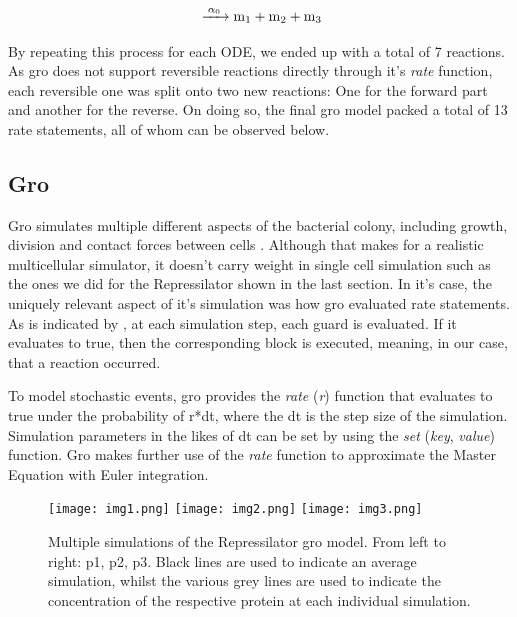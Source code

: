 \documentclass[12pt]{article}
\begin{document}
    \begin{equation}
    \ce{ ->[\alpha_{0}] m_{1} + m_{2} + m_{3}}
    \end{equation}
    
    By repeating this process for each ODE, we ended up with a total of 7 reactions. As gro does not support reversible reactions directly through it's \textit{rate} function, each reversible one was split onto two new reactions: One for the forward part and another for the reverse. On doing so, the final gro model packed a total of 13 rate statements, all of whom can be observed below.
    
    

\subsection{Gro}
    
    Gro simulates multiple different aspects of the bacterial colony, including growth, division and contact forces between cells \cite{Jang2012}. Although that makes for a realistic multicellular simulator, it doesn't carry weight in single cell simulation such as the ones we did for the Repressilator shown in the last section. In it's case, the uniquely relevant aspect of it's simulation was how gro evaluated rate statements. As is indicated by \cite{Hoops2006}, at each simulation step, each guard is evaluated. If it evaluates to true, then the corresponding block is executed, meaning, in our case, that a reaction occurred.
    
    To model stochastic events, gro provides the \textit{rate} (\textit{r}) function that evaluates to true under the probability of r*dt, where the dt is the step size of the simulation. Simulation parameters in the likes of dt can be set by using the \textit{set} (\textit{key}, \textit{value}) function. Gro makes further use of the \textit{rate} function to approximate the Master Equation with Euler integration. 
    
    \begin{figure}[ht]
    \centering
      \texttt{[image: img1.png]}
    \endminipage\hfill
      \texttt{[image: img2.png]}
    \endminipage\hfill
      \texttt{[image: img3.png]}
    \endminipage
    \caption{Multiple simulations of the Repressilator gro model. From left to right: p1, p2, p3. Black lines are used to indicate an average simulation, whilst the various grey lines are used to indicate the concentration of the respective protein at each individual simulation.}
    \label{fig:tons_of_simulations}
    \end{figure}
\end{document}
